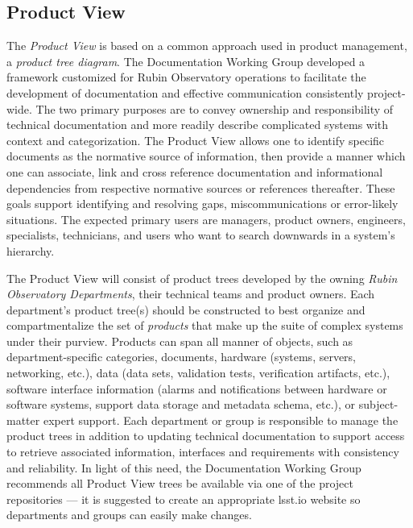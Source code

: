 \subsection{Product View}

The \emph{Product View} is based on a common approach used in product management, a \emph{product tree diagram}.
The Documentation Working Group developed a framework customized for Rubin Observatory operations to facilitate the development of documentation and effective communication consistently project-wide.
The two primary purposes are to convey ownership and responsibility of technical documentation and more readily describe complicated systems with context and categorization.
The Product View allows one to identify specific documents as the normative source of information, then provide a manner which one can associate, link and cross reference documentation and informational dependencies from respective normative sources or references thereafter.
These goals support identifying and resolving gaps, miscommunications or error-likely situations.
The expected primary users are managers, product owners, engineers, specialists, technicians, and users who want to search downwards in a system's hierarchy.

The Product View will consist of product trees developed by the owning \emph{Rubin Observatory Departments}, their technical teams and product owners.
Each department's product tree(s) should be constructed to best organize and compartmentalize the set of \emph{products} that make up the suite of complex systems under their purview.
Products can span all manner of objects, such as department-specific categories, documents, hardware (systems, servers, networking, etc.), data (data sets, validation tests, verification artifacts, etc.), software interface information (alarms and notifications between hardware or software systems, support data storage and metadata schema, etc.), or subject-matter expert support.
Each department or group is responsible to manage the product trees in addition to updating technical documentation to support access to retrieve associated information, interfaces and requirements with consistency and reliability.
In light of this need, the Documentation Working Group recommends all Product View trees be available via one of the project repositories --- it is suggested to create an appropriate lsst.io website so departments and groups can easily make changes.

